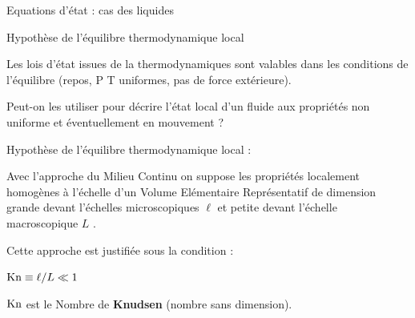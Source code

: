 {\begin{frame}{Equations d'état : cas des liquides}
\bigskip

\begin{frame}{Hypothèse de l'équilibre thermodynamique local}


Les lois d'état issues de la thermodynamiques sont valables dans les conditions de l'équilibre 
(repos, P T uniformes, pas de force extérieure).

\medskip


Peut-on les utiliser pour décrire l'état local d'un fluide aux propriétés non uniforme et éventuellement en mouvement ?

\medskip 

Hypothèse de l'équilibre thermodynamique local : 

\medskip

Avec l'approche du Milieu Continu on suppose les propriétés localement homogènes à l'échelle
d'un Volume Elémentaire Représentatif de dimension grande devant l'échelles microscopiques 
$\ell$ et petite devant l'échelle macroscopique $L$ .

\medskip 
Cette approche est justifiée sous la condition :

\smallskip
$\textrm{Kn} \equiv \ell / L \ll 1 $

\smallskip

$\textrm{Kn}$ est le Nombre de \textcolor{rouge}{\bf Knudsen} (nombre sans dimension).









\vspace{5mm}

\end{frame}






\end{frame}}

